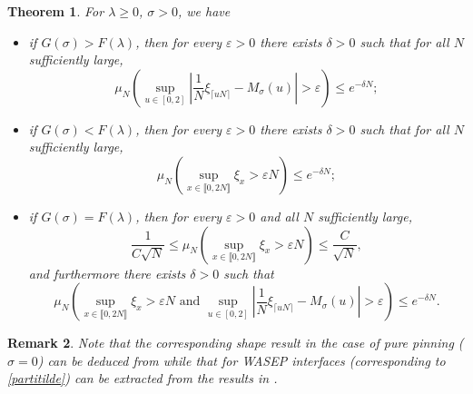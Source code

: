 \documentclass[reqno,11pt]{amsart}
\numberwithin{equation}{section}
\newcommand{\gep}{\varepsilon}       %
\newcommand{\lint}{\llbracket}
\newcommand{\rint}{\rrbracket}
\newtheorem{theorem}{Theorem}[section]
\newtheorem{rem}[theorem]{Remark}
\begin{document}
\begin{theorem}\label{th:shapeandcontact1}
 For $\lambda \geq 0$, $\sigma >0$, we have
\begin{itemize}
\item[1.] if $G(\sigma)>F(\lambda)$, then for every $\gep>0$ there exists $\delta>0$ such that for all $N$ sufficiently large,
\begin{equation}\label{areadomshape}
\mu_N \left(  \sup_{u\in[0,2]}\left| \frac{1}{N}\xi_{\lceil u N\rceil}-M_{\sigma}(u) \right|>\gep \right)\le e^{-\delta N};
\end{equation}

\item[2.] if $G(\sigma) < F(\lambda)$, then for every $\gep>0$ there exists $\delta>0$ such that 
for all $N$ sufficiently large, 
\begin{equation}
\mu_N \left( \sup_{x\in \lint 0,2N \rint} \xi_{x} > \gep N \right)\le e^{-\delta N};
\label{pindomshape}
\end{equation}
\item[3.] if $G(\sigma) = F(\lambda)$, then for every $\gep>0$  
and all $N$ sufficiently large, 
\begin{equation}
 \frac{1}{C\sqrt{N}} \le \mu_N \left( \sup_{x\in \lint 0,2N \rint} \xi_{x} > \gep N \right)\le \frac{C}{\sqrt{N}},
\label{pindomshapetie}
\end{equation}
and furthermore there exists $\delta>0$ such that
\begin{equation}\label{pintieareashape}
\mu_N \left(  \sup_{x\in \lint 0,2N \rint} \xi_{x} > \gep N  \text{ and } \sup_{u\in[0,2]}\left| \frac{1}{N}\xi_{\lceil u N\rceil}-M_{\sigma}(u) \right|>\gep \right)\le e^{-\delta N}.
\end{equation} 

\end{itemize}
 
\end{theorem} 


\begin{rem}
 Note that the corresponding shape result in the case of pure pinning ($\sigma=0$) can be deduced from \cite[Chapter 2]{GiacominPolymerbk} while that for
 WASEP interfaces (corresponding to \eqref{partitilde}) can be extracted from the results in \cite{LabbeWABridge}.
\end{rem}
\end{document}
